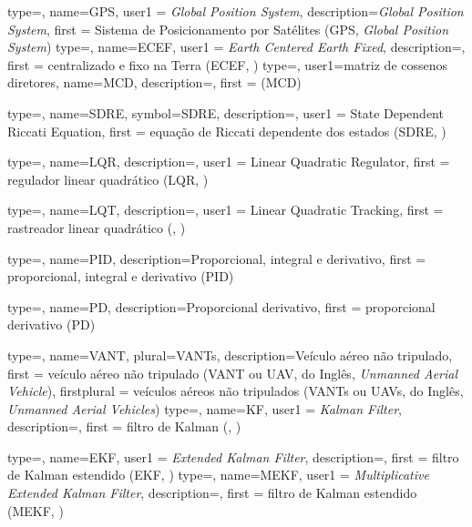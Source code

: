 {type=\acronymtype,
  name={GPS},
  user1 = {\emph{Global Position System}},
  description={\emph{Global Position System}},
  first = {Sistema de Posicionamento por Satélites (GPS, \emph{Global Position System})}
}
{type=\acronymtype,
  name={ECEF},
  user1 = {\emph{Earth Centered Earth Fixed}},
  description={},
  first = {centralizado e fixo na Terra (ECEF, )}
}
{type=\acronymtype,
  user1={matriz de cossenos diretores},
  name={MCD},
  description={},
  first = { (MCD)}
}

{type=\acronymtype,
  name={SDRE},
  symbol={SDRE},
  description={\emph{}},
  user1 = {State Dependent Riccati Equation},
  first = {equação de Riccati dependente dos estados (SDRE, \emph{})}
}

{type=\acronymtype,
  name={LQR},
  description={\emph{}},
  user1 = {Linear Quadratic Regulator},
  first = {regulador linear quadrático (LQR, \emph{})}
}

{type=\acronymtype,
  name={LQT},
  description={\emph{}},
  user1 = {Linear Quadratic Tracking},
  first = {rastreador linear quadrático (, \emph{})}
}

{type=\acronymtype,
  name={PID},
  description={Proporcional, integral e derivativo},
  first = {proporcional, integral e derivativo (PID)}
}

{type=\acronymtype,
  name={PD},
  description={Proporcional derivativo},
  first = {proporcional derivativo (PD)}
}

{type=\acronymtype,
  name={VANT},
  plural={VANTs},
  description={Veículo aéreo não tripulado},
  first = {veículo aéreo não tripulado (VANT ou UAV, do Inglês, \emph{Unmanned Aerial Vehicle})},
  firstplural = {veículos aéreos não tripulados (VANTs ou UAVs, do Inglês, \emph{Unmanned Aerial Vehicles})}
}
{type=\acronymtype,
  name={KF},
  user1 = {\emph{Kalman Filter}},
  description=,
  first = {filtro de Kalman (, )}
}


{type=\acronymtype,
  name={EKF},
  user1 = {\emph{Extended Kalman Filter}},
  description={},
  first = {filtro de Kalman estendido (EKF, )}
}
{type=\acronymtype,
  name={MEKF},
  user1 = \emph{Multiplicative Extended Kalman Filter},
  description=,
  first = {filtro de Kalman estendido (MEKF, )}
}


